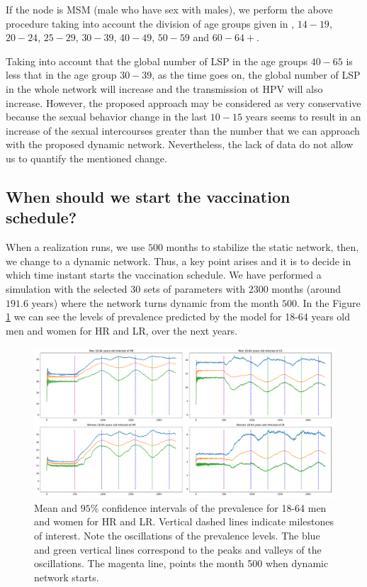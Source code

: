 If the node is MSM (male who have sex with males), we perform the above procedure taking into account the division of age groups given in \cite{Durex2002}, $14-19$, $20-24$, $25-29$, $30-39$, $40-49$, $50-59$ and $60-64+$.

Taking into account that the global number of LSP in the age groups $40-65$ is less that in the age group $30-39$, as the time goes on, the global number of LSP in the whole network will increase and the transmission ot HPV will also increase. However, the proposed approach may be considered as very conservative because the sexual behavior change in the last $10-15$ years seems to result in an increase of the sexual intercourses greater than the number that we can approach with the proposed dynamic network. Nevertheless, the lack of data do not allow us to quantify the mentioned change.


\subsection{When should we start the vaccination schedule?} 
When a realization runs, we use $500$ months to stabilize the static network, then, we change to a dynamic network. Thus, a key point arises and it is to decide in which time instant starts the vaccination schedule. We have performed a simulation with the selected $30$ sets of parameters with $2300$ months (around $191.6$ years) where the network turns dynamic from the month $500$. In the Figure \ref{fig:Estudio_ciclos} we can see the levels of prevalence predicted by the model for 18-64 years old men and women for HR and LR, over the next years.

\begin{figure}[h!]
	\centering
	\includegraphics[width=\linewidth]{IMGs/2.-New_features/Estudio_ciclos.pdf}
	\caption{Mean and $95\%$ confidence intervals of the prevalence for 18-64 men and women for HR and LR. Vertical dashed lines indicate milestones of interest. Note the oscillations of the prevalence levels. The blue and green vertical lines correspond to the peaks and valleys of the oscillations. The magenta line, points the month 500 when dynamic network starts.}
	\label{fig:Estudio_ciclos}
\end{figure}

